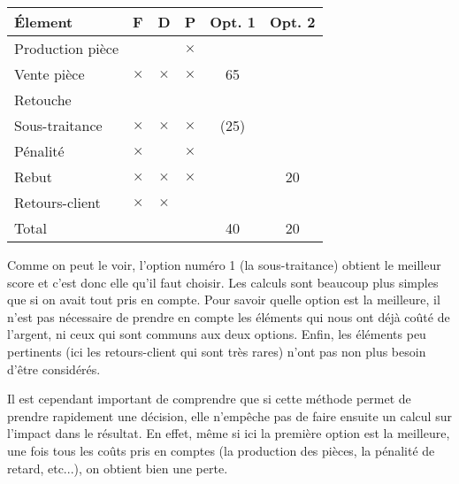 \begingroup
\scriptsize
\begin{center}
\begin{tabular}{llcccc}
  \'Element        & F        & D        & P         & Opt.\/ 1 & Opt.\/ 2 \\
  \hline
  Production pièce &          &          & $\times$  &         &         \\
  Vente pièce      & $\times$ & $\times$ & $\times$  &  65     &         \\
  Retouche         &          &          &           &         &         \\
  Sous-traitance   & $\times$ & $\times$ & $\times$  & (25)    &         \\
  Pénalité         & $\times$ &          & $\times$  &         &         \\
  Rebut            & $\times$ & $\times$ & $\times$  &         & 20      \\
  Retours-client   & $\times$ & $\times$ &           &         &         \\
  \hline
  \multicolumn{4}{l}{\hspace{1em} Total}             & 40      & 20\\
\end{tabular}
\end{center}
\endgroup

Comme on peut le voir, l'option numéro 1 (la sous-traitance) obtient 
le meilleur score et c'est donc elle qu'il faut choisir. 
Les calculs sont beaucoup plus simples que si on avait tout 
pris en compte. 
Pour savoir quelle option est la meilleure, il n'est pas nécessaire de 
prendre en compte les éléments qui nous ont déjà coûté de l'argent, 
ni ceux qui sont communs aux deux options. 
Enfin, les éléments peu pertinents (ici les retours-client qui sont 
très rares) n'ont pas non plus besoin d'être considérés. 


Il est cependant important de comprendre que si cette méthode 
permet de prendre rapidement une décision, elle n'empêche pas 
de faire ensuite un calcul sur l'impact dans le résultat. 
En effet, même si ici la première option est la meilleure, 
une fois tous les coûts pris en comptes (la production des 
pièces, la pénalité de retard, etc...\/), on obtient bien 
une perte.
